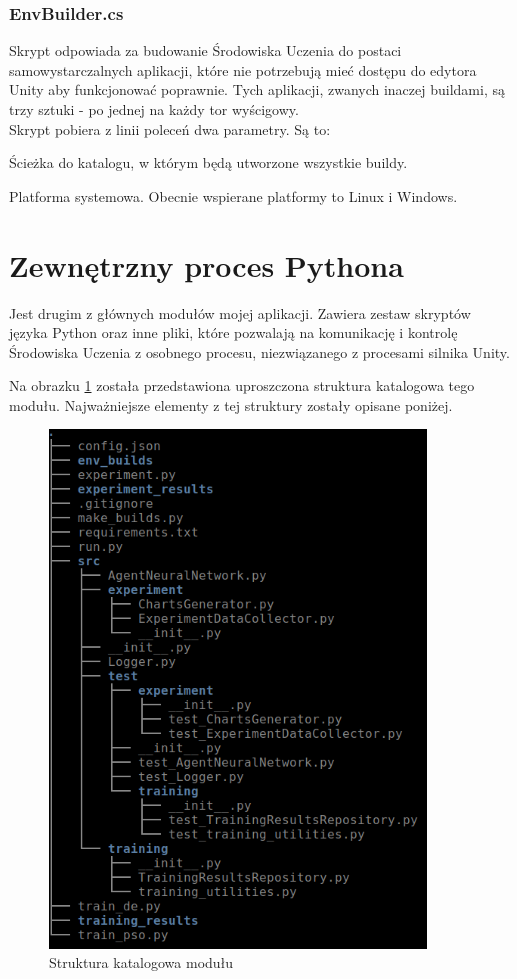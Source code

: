 \subsubsection{EnvBuilder.cs}
Skrypt odpowiada za budowanie Środowiska Uczenia do postaci samowystarczalnych aplikacji, które nie potrzebują mieć dostępu do edytora Unity aby funkcjonować poprawnie. Tych aplikacji, zwanych inaczej buildami, są trzy sztuki - po jednej na każdy tor wyścigowy. \\
Skrypt pobiera z linii poleceń dwa parametry. Są to:
\begin{itemize*}
\item Ścieżka do katalogu, w którym będą utworzone wszystkie buildy.
\item Platforma systemowa. Obecnie wspierane platformy to Linux i Windows.
\end{itemize*}

\newpage
\section{Zewnętrzny proces Pythona}
Jest drugim z głównych modułów mojej aplikacji. Zawiera zestaw skryptów języka Python oraz inne pliki, które pozwalają na komunikację i kontrolę Środowiska Uczenia z osobnego procesu, niezwiązanego z procesami silnika Unity.

Na obrazku \ref{PythonProcessStructure} została przedstawiona uproszczona struktura katalogowa tego modułu. Najważniejsze elementy z tej struktury zostały opisane poniżej. 
\vspace{0.5cm}
\begin{figure}[H]
\centering
\includegraphics[width=10cm]{resources/figures/python_process_structure.png}
\caption{Struktura katalogowa modułu}
\label{PythonProcessStructure}
\end{figure}

